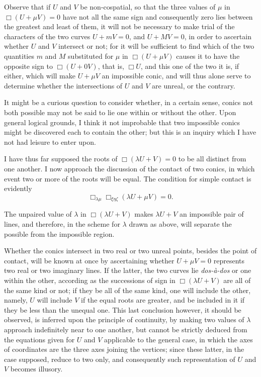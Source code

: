 \documentclass[11pt]{article}
\newcommand{\sourcepage}[1]{\marginpar{\scriptsize p.~#1}}
\begin{document}
{{\sourcepage{128}
Observe that if $U$ and $V$ be non-cospatial, so that the three values of $\mu$ in $\Box(U+\mu V)=0$ have not all the same sign and consequently zero lies between the greatest and least of them, it will not be necessary to make trial of the characters of the two curves $U+mV=0$, and $U+MV=0$, in order to ascertain whether $U$ and $V$ intersect or not; for it will be sufficient to find which of the two quantities $m$ and $M$ substituted for $\mu$ in $\Box(U+\mu V)$ causes it to have the opposite sign to $\Box(U+0V)$, that is, $\Box U$, and this one of the two it is, if either, which will make $U+\mu V$ an impossible conic, and will thus alone serve to determine whether the intersections of $U$ and $V$ are unreal, or the contrary.

It might be a curious question to consider whether, in a certain sense, conics not both possible may not be said to lie one within or without the other. Upon general logical grounds, I think it not improbable that two impossible conics might be discovered each to contain the other; but this is an inquiry which I have not had leisure to enter upon.

I have thus far supposed the roots of $\Box(\lambda U+V)=0$ to be all distinct from one another. I now approach the discussion of the contact of two conics, in which event two or more of the roots will be equal. The condition for simple contact is evidently
\[
\Box_{\lambda\mu}\Box_{\xi\eta\zeta}(\lambda U+\mu V)=0.
\]

The unpaired value of $\lambda$ in $\Box(\lambda U+V)$ makes $\lambda U+V$ an impossible pair of lines, and therefore, in the scheme for $\lambda$ drawn as above, will separate the possible from the impossible region.

Whether the conics intersect in two real or two unreal points, besides the point of contact, will be known at once by ascertaining whether $U+\mu V=0$ represents two real or two imaginary lines. If the latter, the two curves lie \emph{dos-\`a-dos} or one within the other, according as the successions of sign in $\Box(\lambda U+V)$ are all of the same kind or not; if they be all of the same kind, one will include the other, namely, $U$ will include $V$ if the equal roots are greater, and be included in it if they be less than the unequal one. This last conclusion however, it should be observed, is inferred upon the principle of continuity, by making two values of $\lambda$ approach indefinitely near to one another, but cannot be strictly deduced from the equations given for $U$ and $V$ applicable to the general case, in which the axes of coordinates are the three axes joining the vertices; since these latter, in the case supposed, reduce to two only, and consequently such representation of $U$ and $V$ becomes illusory.

}}
\end{document}
